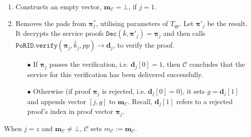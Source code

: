 \begin{enumerate}
\begin{enumerate}
\item Constructs an empty vector, $\bm{m}_{\scriptscriptstyle\mathcal C}=\bot$, if $j=1$. 

\item Removes the pads from $\bm{\pi}^{\scriptscriptstyle *}_{\scriptscriptstyle j}$, utilising  parameters of $T_{\scriptscriptstyle qp}$. Let $\bm{\pi}'_{\scriptscriptstyle j}$ be the result. It decrypts the service proofs $\mathtt{Dec}(\bar{k},\bm{\pi}'_{\scriptscriptstyle j})=\bm{\pi}_{\scriptscriptstyle j}$ and then calls $\mathtt{PoRID.verify}(\bm{\pi}_{\scriptscriptstyle j}, \hat{k}_{\scriptscriptstyle j}, {pp})\rightarrow \bm{d}_{\scriptscriptstyle j}$, to verify the proof.  

\begin{itemize}
\item[$\bullet$] If $ {\bm{\pi}}_{\scriptscriptstyle j}$ passes the verification, i.e. $ {\bm{d}}_{\scriptscriptstyle j}[0]=1$, then $\mathcal C$  concludes that the service for this verification has been delivered successfully.  


\item[$\bullet$] Otherwise (if proof $ {\bm{\pi}}_{\scriptscriptstyle j}$ is rejected, i.e. $ {\bm{d}}_{\scriptscriptstyle j}[0]=0$),  it sets $g= {\bm{d}}_{\scriptscriptstyle j}[1]$ and appends vector $[j,g]$  to $ {\bm{m}}_{\scriptscriptstyle\mathcal{C}}$. Recall, $ {\bm{d}}_{\scriptscriptstyle j}[1]$ refers to a rejected proof's index in proof vector $ {\bm{\pi}}_{\scriptscriptstyle j}$. 

\end{itemize}
\end{enumerate}
When $j=z$  and $\bm{m}_{\scriptscriptstyle\mathcal{C}}\neq\bot$, $\mathcal C$ sets    ${m}_{\scriptscriptstyle\mathcal C}:=\bm{m}_{\scriptscriptstyle\mathcal{C}}$.





\end{enumerate}
